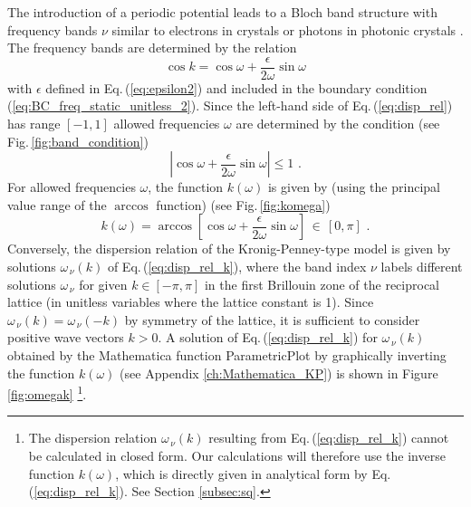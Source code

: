 The introduction of a periodic potential leads to a Bloch band structure 
with frequency bands $\nu$ similar to electrons in crystals
\cite{Ashcroft1976} or photons in photonic crystals \cite{Joannopoulos2008}.
The frequency bands are determined by the relation
%
\begin{equation}\label{eq:disp_rel}
    \cos{k} = \cos{\omega} + \frac{\epsilon}{2\omega}\sin{\omega}
\end{equation}
%
with $\epsilon$ defined in Eq.\,(\ref{eq:epsilon2}) and included in the boundary condition 
(\ref{eq:BC_freq_static_unitless_2}). 
Since the left-hand side of Eq.\,(\ref{eq:disp_rel}) has range $[-1,1]$ allowed frequencies 
$\omega$ are determined by the condition (see Fig.\,\ref{fig:band_condition})
%
\begin{equation}\label{eq:bands_condition}
    \left|\cos{\omega} + \frac{\epsilon}{2\omega}\sin{\omega}\right| \leq 1 \, \, .
\end{equation}
%
For allowed frequencies $\omega$, the function $k(\omega)$ is given by
(using the principal value range of the $\arccos$ function) (see Fig.\,\ref{fig:komega})
%
\begin{equation}\label{eq:disp_rel_k}
    k(\omega) = \arccos\left[ \cos{\omega} + \frac{\epsilon}{2\omega}\sin{\omega} \right] \, \in \, [0, \pi] \, \, .
\end{equation}
%
Conversely, the dispersion relation of the Kronig-Penney-type model is given by solutions 
$\omega_{\, \nu}(k)$ of Eq.\,(\ref{eq:disp_rel_k}), where the 
band index $\nu$ labels different solutions $\omega_{\, \nu}$ for given $k \in [-\pi, \pi]$
in the first Brillouin zone of the reciprocal lattice (in unitless variables where the lattice
constant is 1).
Since $\omega_{\, \nu}(k) = \omega_{\, \nu}(-k)$ by symmetry of the lattice, 
it is sufficient to consider positive wave vectors $k>0$. 
A solution 
of Eq.\,(\ref{eq:disp_rel_k}) for $\omega_{\, \nu}(k)$ obtained by the Mathematica function ParametricPlot 
by graphically inverting the function $k(\omega)$
(see Appendix \ref{ch:Mathematica_KP}) is shown in Figure \ref{fig:omegak}
%
\footnote{The dispersion relation $\omega_{\, \nu}(k)$ resulting from Eq.\,(\ref{eq:disp_rel_k}) cannot be 
calculated in closed form. Our calculations will therefore use the inverse function $k(\omega)$,
which is directly given in analytical form by Eq.\,(\ref{eq:disp_rel_k}). See Section \ref{subsec:sq}.}.

